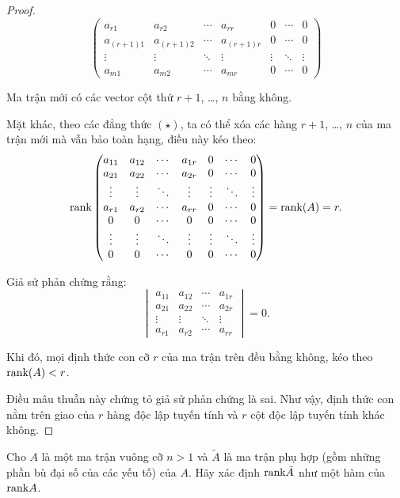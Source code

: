 \documentclass[class=nhvh-linear-algebra,crop=false]{standalone}
\begin{document}
\begin{proof}
\[\begin{pmatrix}
			a_{r1}     & a_{r2}     & \cdots & a_{rr}     & 0      & \cdots & 0      \\
			a_{(r+1)1} & a_{(r+1)2} & \cdots & a_{(r+1)r} & 0      & \cdots & 0      \\
			\vdots     & \vdots     & \ddots & \vdots     & \vdots & \ddots & \vdots \\
			a_{m1}     & a_{m2}     & \cdots & a_{mr}     & 0      & \cdots & 0
		\end{pmatrix}
	\]
	\par Ma trận mới có các vector cột thứ $r+1$, \ldots, $n$ bằng không.
	\par Mặt khác, theo các đẳng thức $(\star)$, ta có thể xóa các hàng $r+1$, \ldots, $n$ của ma trận mới mà vẫn bảo toàn hạng, điều này kéo theo:
	\[
		\text{rank}
		\begin{pmatrix}
			a_{11} & a_{12} & \cdots & a_{1r} & 0      & \cdots & 0      \\
			a_{21} & a_{22} & \cdots & a_{2r} & 0      & \cdots & 0      \\
			\vdots & \vdots & \ddots & \vdots & \vdots & \ddots & \vdots \\
			a_{r1} & a_{r2} & \cdots & a_{rr} & 0      & \cdots & 0      \\
			0      & 0      & \cdots & 0      & 0      & \cdots & 0      \\
			\vdots & \vdots & \ddots & \vdots & \vdots & \ddots & \vdots \\
			0      & 0      & \cdots & 0      & 0      & \cdots & 0
		\end{pmatrix}
		= \text{rank}(A) = r.
	\]
	\par Giả sử phản chứng rằng:
	\[
		\begin{vmatrix}
			a_{11} & a_{12} & \cdots & a_{1r} \\
			a_{21} & a_{22} & \cdots & a_{2r} \\
			\vdots & \vdots & \ddots & \vdots \\
			a_{r1} & a_{r2} & \cdots & a_{rr}
		\end{vmatrix} = 0.
	\]
	\par Khi đó, mọi định thức con cỡ $r$ của ma trận trên đều bằng không, kéo theo $\text{rank}(A) < r$.
	\par Điều mâu thuẫn này chứng tỏ giả sử phản chứng là sai. Như vậy, định thức con nằm trên giao của $r$ hàng độc lập tuyến tính và $r$ cột độc lập tuyến tính khác không.
\end{proof}

\begin{exercise}
	\par Cho $A$ là một ma trận vuông cỡ $n > 1$ và $\tilde{A}$ là ma trận phụ hợp (gồm những phần bù đại số của các yếu tố) của $A$. Hãy xác định $\text{rank}\tilde{A}$ như một hàm của $\text{rank} A$.
\end{exercise}
\end{document}
